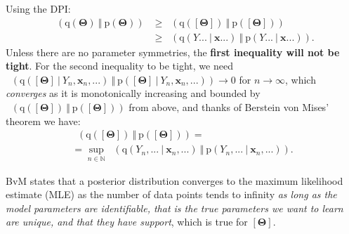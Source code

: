 \documentclass[25pt,a0paper,landscape]{tikzposter}
\newcommand{\MidSymbol}[1][]{\:#1\:}
\newcommand{\given}{\MidSymbol[\vert]}
\DeclareMathOperator{\opKale}{D_\mathrm{KL}}
\newcommand{\Kale}[2]{\opKale(#1 \MidSymbol[\Vert] #2)}
\newcommand{\opp}{\mathrm{p}}
\newcommand{\pof}[1]{\opp(#1)}
\newcommand{\opq}{\mathrm{q}}
\newcommand{\qof}[1]{\opq(#1)}
\newcommand{\W}{\boldsymbol{\Theta}}
\newcommand{\Dany}{\mathcal{D}}
\newcommand{\Y}{Y}
\newcommand{\x}{\boldsymbol{x}}
\begin{document}
\begin{columns}
{\begin{multicols}{2}
      \begin{tikzfigure}
      \end{tikzfigure}
    \begin{proofbox}[title=Equality in the Infinite Data Limit]
      Using the DPI:
      \begin{align*}
      \Kale{\qof{\W}}{\pof{\W}} &\ge \Kale{\qof{[\W]}}{\pof{[\W]}} \\
      &\ge \Kale{\qof{\Y...\given\x...}}{\pof{\Y...\given\x...}}.
      \end{align*}
      Unless there are no parameter symmetries, the \textbf{first inequality will not be tight}.
      For the second inequality to be tight, we need $\Kale{\qof{[\W] \given \Y_n,\x_n,...}}{\pof{[\W] \given \Y_n,\x_n,...}} \to 0$ for $n \to \infty$, which \emph{converges} as it is monotonically increasing and bounded by $\Kale{\qof{[\W]}}{\pof{[\W]}}$ from above, and thanks of Berstein von Mises' theorem we have:
      \begin{multline*}
      \Kale{\qof{[\W]}}{\pof{[\W]}} = \\
      = \sup_{n\in \mathbb{N}} \Kale{\qof{\Y_n,...\given\x_n,...}}{\pof{\Y_n,...\given\x_n,...}}.
      \end{multline*}
    \end{proofbox}
    \begin{theorybox}[title=Bernstein von Mises' Theorem]
      BvM states that a posterior distribution converges to the maximum likelihood estimate (MLE) as the number of data points tends to infinity \emph{as long as the model parameters are identifiable, that is the true parameters we want to learn are unique, and that they have support}, which is true for $[\W]$. 

\end{theorybox}
\end{multicols}}
\end{columns}
\end{document}
